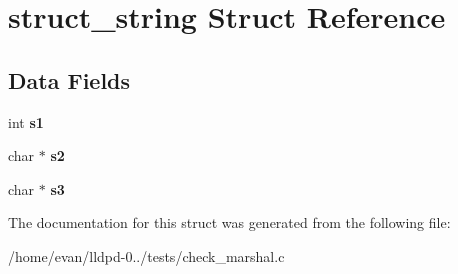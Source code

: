 \section{struct\-\_\-string \-Struct \-Reference}
\label{structstruct__string}
\subsection*{\-Data \-Fields}
\begin{DoxyCompactItemize}
\item 
int {\bfseries s1}\label{structstruct__string_acfb6b9e2b00e34da4313b463c341e597}

\item 
char $\ast$ {\bfseries s2}\label{structstruct__string_a96d0c5c02558b19c89e9d62b94866c7c}

\item 
char $\ast$ {\bfseries s3}\label{structstruct__string_a45baae5e311f7584535786be786c6600}

\end{DoxyCompactItemize}


\-The documentation for this struct was generated from the following file\-:\begin{DoxyCompactItemize}
\item 
/home/evan/lldpd-\/0../tests/check\-\_\-marshal.\-c\end{DoxyCompactItemize}
